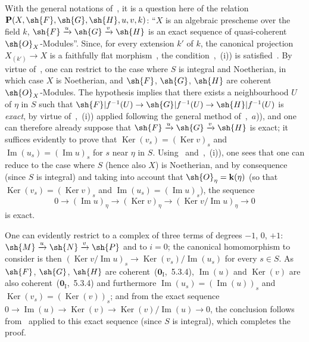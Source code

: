 With the general notations of~, it is a question here of the relation $\mathbf{P}(X,\sh{F},\sh{G},\sh{H},u,v,k)$: ``$X$ is an algebraic prescheme over the field $k$, $\sh{F}\xrightarrow{u}\sh{G}\xrightarrow{v}\sh{H}$ is an exact sequence of quasi-coherent $\sh{O}_X$-Modules''.
Since, for every extension $k'$ of $k$, the canonical projection $X_{(k')}\to X$ is a faithfully flat morphism~, the condition~,~(i)) is satisfied~.
By virtue of~, one can restrict to the case where $S$ is integral and Noetherian, in which case $X$ is Noetherian, and $\sh{F}$, $\sh{G}$, $\sh{H}$ are coherent $\sh{O}_X$-Modules.
The hypothesis implies that there exists a neighbourhood $U$ of $\eta$ in $S$ such that $\sh{F}|f^{-1}(U)\to\sh{G}|f^{-1}(U)\to\sh{H}|f^{-1}(U)$ is \emph{exact}, by virtue of~,~(i)) applied following the general method of~,~$a$)), and one can therefore already suppose that $\sh{F}\xrightarrow{u}\sh{G}\xrightarrow{v}\sh{H}$ is exact; it suffices evidently to prove that $\operatorname{Ker}(v_s)=(\operatorname{Ker} v)_s$ and $\operatorname{Im}(u_s)=(\operatorname{Im} u)_s$ for $s$ near $\eta$ in $S$.
Using~ and~,~(i)), one sees that one can reduce to the case where $S$ (hence also $X$) is Noetherian, and by
consequence (since $S$ is integral) and taking into account that $\sh{O}_\eta=\mathbf{k}(\eta)$ (so that $\operatorname{Ker}(v_s)=(\operatorname{Ker} v)_s$ and $\operatorname{Im}(u_s)=(\operatorname{Im} u)_s$), the sequence
\[
  0\to(\operatorname{Im} u)_\eta\to(\operatorname{Ker} v)_\eta\to(\operatorname{Ker} v/\operatorname{Im} u)_\eta\to 0
\]
is exact.

One can evidently restrict to a complex of three terms of degrees $-1$, $0$, $+1$: $\sh{M}\xrightarrow{u}\sh{N}\xrightarrow{v}\sh{P}$ and to $i=0$; the canonical homomorphism to consider is then $(\operatorname{Ker} v/\operatorname{Im} u)_s\to\operatorname{Ker}(v_s)/\operatorname{Im}(u_s)$ for every $s\in S$.
As $\sh{F}$, $\sh{G}$, $\sh{H}$ are coherent~($\mathbf{0}_{\mathrm{I}}$,~5.3.4), $\operatorname{Im}(u)$ and $\operatorname{Ker}(v)$ are also coherent~($\mathbf{0}_{\mathrm{I}}$,~5.3.4) and furthermore $\operatorname{Im}(u_s)=(\operatorname{Im}(u))_s$ and $\operatorname{Ker}(v_s)=(\operatorname{Ker}(v))_s$; and from the exact sequence $0\to\operatorname{Im}(u)\to\operatorname{Ker}(v)\to\operatorname{Ker}(v)/\operatorname{Im}(u)\to 0$, the conclusion follows from~ applied to this exact sequence (since $S$ is integral), which completes the proof.

